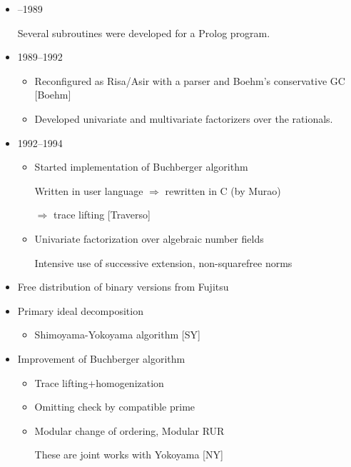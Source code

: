 \begin{slide}{}

\begin{itemize}
\item --1989

Several subroutines were developed for a Prolog program.

\item 1989--1992

\begin{itemize}
\item Reconfigured as Risa/Asir with a parser and Boehm's conservative GC [Boehm]

\item Developed univariate and multivariate factorizers over the rationals.
\end{itemize}

\item 1992--1994

\begin{itemize}
\item Started implementation of Buchberger algorithm

Written in user language $\Rightarrow$ rewritten in C (by Murao)

$\Rightarrow$ trace lifting [Traverso]

\item Univariate factorization over algebraic number fields

Intensive use of successive extension, non-squarefree norms
\end{itemize}
\end{itemize}

\end{slide}

\begin{slide}{}

\begin{itemize}
\item Free distribution of binary versions from Fujitsu

\item Primary ideal decomposition

\begin{itemize}
\item Shimoyama-Yokoyama algorithm [SY]
\end{itemize}

\item Improvement of Buchberger algorithm

\begin{itemize}
\item Trace lifting+homogenization

\item Omitting check by compatible prime

\item Modular change of ordering, Modular RUR

These are joint works with Yokoyama [NY]
\end{itemize}
\end{itemize}

\end{slide}

